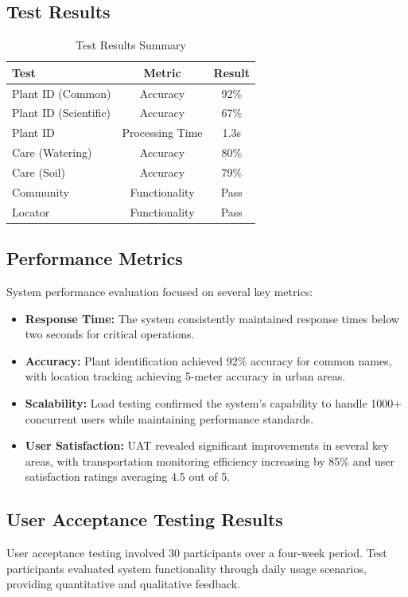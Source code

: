 \documentclass[conference]{IEEEtran}
\begin{document}
\subsection{Test Results}
\begin{table}[h]
\centering
\small
\caption{Test Results Summary}
\label{tab:test_results}
\begin{tabular}{|l|c|c|}
\hline
\textbf{Test} & \textbf{Metric} & \textbf{Result} \\
\hline
Plant ID (Common) & Accuracy & 92\% \\
\hline
Plant ID (Scientific) & Accuracy & 67\% \\
\hline
Plant ID & Processing Time & 1.3s \\
\hline
Care (Watering) & Accuracy & 80\% \\
\hline
Care (Soil) & Accuracy & 79\% \\
\hline
Community & Functionality & Pass \\
\hline
Locator & Functionality & Pass \\
\hline
\end{tabular}
\end{table}

\subsection{Performance Metrics}
System performance evaluation focused on several key metrics:

\begin{itemize}
    \item \textbf{Response Time:} The system consistently maintained response times below two seconds for critical operations.
    \item \textbf{Accuracy:} Plant identification achieved 92\% accuracy for common names, with location tracking achieving 5-meter accuracy in urban areas.
    \item \textbf{Scalability:} Load testing confirmed the system's capability to handle 1000+ concurrent users while maintaining performance standards.
    \item \textbf{User Satisfaction:} UAT revealed significant improvements in several key areas, with transportation monitoring efficiency increasing by 85\% and user satisfaction ratings averaging 4.5 out of 5.
\end{itemize}

\subsection{User Acceptance Testing Results}
User acceptance testing involved 30 participants over a four-week period. Test participants evaluated system functionality through daily usage scenarios, providing quantitative and qualitative feedback.
\end{document}
